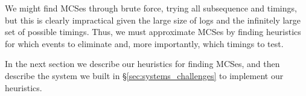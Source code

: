 We might find MCSes through brute force, trying
all subsequence and timings, but this is clearly impractical given the large size of logs and the
infinitely large set of possible timings. Thus, we must approximate MCSes by finding heuristics
for which events to eliminate and, more importantly, which timings to test.

In the next section we describe our heuristics for finding MCSes,
and then
describe the system we built in \S\ref{sec:systems_challenges} to implement
our heuristics.
